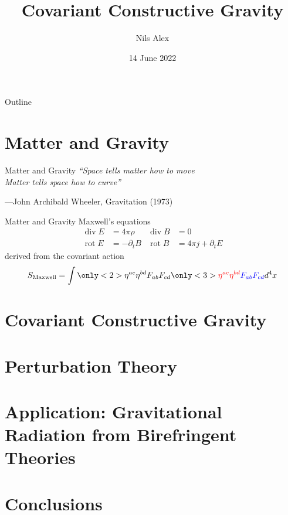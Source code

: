 \documentclass{beamer}
\title{Covariant Constructive Gravity}
\date{14 June 2022}
\author{Nils Alex}
\institute{FAU Erlangen-Nürnberg}
\begin{document}
    \maketitle

    \begin{frame}{Outline}
        \tableofcontents
    \end{frame}


    \section{Matter and Gravity}\label{sec:matter-and-gravity}

    \begin{frame}{Matter and Gravity}
        \Large
        \textit{``Space tells matter how to move \\
        Matter tells space how to curve''}

        \normalsize
        ---John Archibald Wheeler, Gravitation (1973)
    \end{frame}

    \begin{frame}{Matter and Gravity}
        Maxwell's equations
        \begin{align*}
            \operatorname{div} E &= 4\pi \rho & \operatorname{div} B &= 0 \\
            \operatorname{rot} E &= - \partial_t B & \operatorname{rot} B &= 4\pi j + \partial_t E
        \end{align*} \pause
        derived from the covariant action
        \[
            S_\text{Maxwell} = \int \only<2>{\eta^{ac} \eta^{bd} F_{ab} F_{cd}} \only<3>{{\color{red}\eta^{ac} \eta^{bd}} {\color{blue}F_{ab} F_{cd}}} d^4 x
        \]
    \end{frame}

    \section{Covariant Constructive Gravity}\label{sec:covariant-constructive-gravity}

    \section{Perturbation Theory}\label{sec:perturbation-theory}

    \section{Application: Gravitational Radiation from Birefringent Theories}\label{sec:application}

    \section{Conclusions}\label{sec:conclusions}
\end{document}
